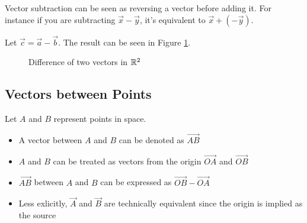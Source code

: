 \documentclass{mlatext}
\begin{document}
\begin{defn}[Subtraction]
  Vector subtraction can be seen as reversing a vector before adding it. For instance if you are subtracting $\vec{x} - \vec{y}$, it's equivalent to $\vec{x} + (-\vec{y})$.

  Let $\vec{c} = \vec{a} - \vec{b}$. The result can be seen in Figure \ref{fig:vec_sub}.
\end{defn}
  \begin{figure}[h]
    \centering
    \caption{Difference of two vectors in $\mathbb{R}^2$}
    \label{fig:vec_sub}
  \end{figure}

\subsection{Vectors between Points}
Let $A$ and $B$ represent points in space.
\begin{itemize}
\item A vector between $A$ and $B$ can be denoted as $\vec{AB}$
\item $A$ and $B$ can be treated as vectors from the origin $\vec{OA}$ and $\vec{OB}$
\item $\vec{AB}$ between $A$ and $B$ can be expressed as $\vec{OB} - \vec{OA}$
\item Less exlicitly, $\vec{A}$ and $\vec{B}$ are technically equivalent since the origin is implied as the source
\end{itemize}
\end{document}
